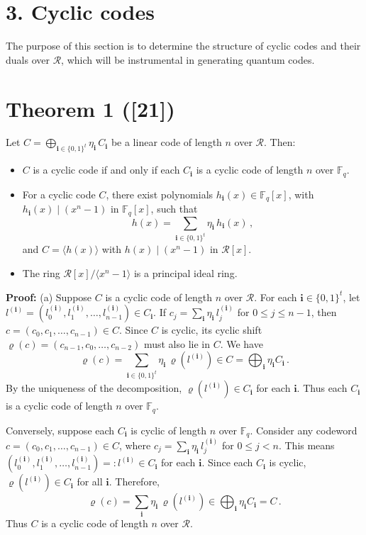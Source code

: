 \documentclass[12pt]{article}
\begin{document}
\section*{3. Cyclic codes}
The purpose of this section is to determine the structure of cyclic codes and their duals over $\mathcal{R}$, which will be instrumental in generating quantum codes.

\section*{Theorem 1 ([21])}
Let $C = \bigoplus\limits_{\mathbf{i} \in \{0,1\}^t} \eta_{\mathbf{i}}\, C_{\mathbf{i}}$ be a linear code of length $n$ over $\mathcal{R}$. Then:

\begin{itemize}
    \item[(a)] $C$ is a cyclic code if and only if each $C_{\mathbf{i}}$ is a cyclic code of length $n$ over $\mathbb{F}_q$.
    \item[(b)] For a cyclic code $C$, there exist polynomials $h_{\mathbf{i}}(x) \in \mathbb{F}_q[x]$, with $h_{\mathbf{i}}(x) \mid (x^n - 1)$ in $\mathbb{F}_q[x]$, such that 
    \[
    h(x) = \sum_{\mathbf{i} \in \{0,1\}^t} \eta_{\mathbf{i}}\, h_{\mathbf{i}}(x)\,,
    \] 
    and $C = \langle h(x) \rangle$ with $h(x) \mid (x^n - 1)$ in $\mathcal{R}[x]$.
    \item[(c)] The ring $\mathcal{R}[x]/\langle x^n - 1 \rangle$ is a principal ideal ring.
\end{itemize}

\textbf{Proof:}
(a) Suppose $C$ is a cyclic code of length $n$ over $\mathcal{R}$. For each $\mathbf{i} \in \{0,1\}^t$, let $l^{(\mathbf{i})} = (l^{(\mathbf{i})}_0, l^{(\mathbf{i})}_1, \dots, l^{(\mathbf{i})}_{n-1}) \in C_{\mathbf{i}}$. If $c_j = \sum_{\mathbf{i}} \eta_{\mathbf{i}}\, l^{(\mathbf{i})}_j$ for $0 \le j \le n-1$, then $c = (c_0, c_1, \dots, c_{n-1}) \in C$. Since $C$ is cyclic, its cyclic shift $\varrho(c) = (c_{n-1}, c_0, \dots, c_{n-2})$ must also lie in $C$. We have 
\[
\varrho(c) = \sum_{\mathbf{i} \in \{0,1\}^t} \eta_{\mathbf{i}}\, \varrho(l^{(\mathbf{i})}) \in C = \bigoplus_{\mathbf{i}} \eta_{\mathbf{i}} C_{\mathbf{i}}\,.
\] 
By the uniqueness of the decomposition, $\varrho(l^{(\mathbf{i})}) \in C_{\mathbf{i}}$ for each $\mathbf{i}$. Thus each $C_{\mathbf{i}}$ is a cyclic code of length $n$ over $\mathbb{F}_q$.

Conversely, suppose each $C_{\mathbf{i}}$ is cyclic of length $n$ over $\mathbb{F}_q$. Consider any codeword $c = (c_0, c_1, \dots, c_{n-1}) \in C$, where $c_j = \sum_{\mathbf{i}} \eta_{\mathbf{i}}\, l^{(\mathbf{i})}_j$ for $0 \le j < n$. This means $(l^{(\mathbf{i})}_0, l^{(\mathbf{i})}_1, \dots, l^{(\mathbf{i})}_{n-1}) =: l^{(\mathbf{i})} \in C_{\mathbf{i}}$ for each $\mathbf{i}$. Since each $C_{\mathbf{i}}$ is cyclic, $\varrho(l^{(\mathbf{i})}) \in C_{\mathbf{i}}$ for all $\mathbf{i}$. Therefore, 
\[
\varrho(c) = \sum_{\mathbf{i}} \eta_{\mathbf{i}}\, \varrho(l^{(\mathbf{i})}) \in \bigoplus_{\mathbf{i}} \eta_{\mathbf{i}} C_{\mathbf{i}} = C\,.
\] 
Thus $C$ is a cyclic code of length $n$ over $\mathcal{R}$.
\end{document}
